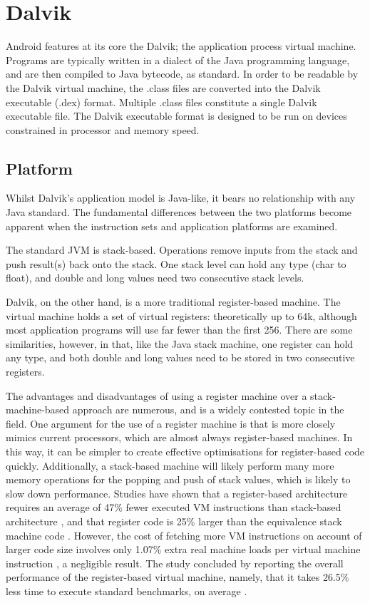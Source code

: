 \section{Dalvik}
\label{sec:dalvik}

Android features at its core the Dalvik; the application process virtual machine. Programs are typically written in a dialect of the Java programming language, and are then compiled to Java bytecode, as standard. In order to be readable by the Dalvik virtual machine, the .class files are converted into the Dalvik executable (.dex) format. Multiple .class files constitute a single Dalvik executable file. The Dalvik executable format is designed to be run on devices constrained in processor and memory speed.

\subsection*{Platform}

Whilst Dalvik's application model is Java-like, it bears no relationship with any Java standard. The fundamental differences between the two platforms become apparent when the instruction sets and application platforms are examined.

The standard JVM is stack-based. Operations remove inputs from the stack and push result(s) back onto the stack. One stack level can hold any type (char to float), and double and long values need two consecutive stack levels.

Dalvik, on the other hand, is a more traditional register-based machine. The virtual machine holds a set of virtual registers: theoretically up to 64k, although most application programs will use far fewer than the first 256. There are some similarities, however, in that, like the Java stack machine, one register can hold any type, and both double and long values need to be stored in two consecutive registers.

The advantages and disadvantages of using a register machine over a stack-machine-based approach are numerous, and is a widely contested topic in the field. One argument for the use of a register machine is that is more closely mimics current processors, which are almost always register-based machines. In this way, it can be simpler to create effective optimisations for register-based code quickly. Additionally, a stack-based machine will likely perform many more memory operations for the popping and push of stack values, which is likely to slow down performance. Studies have shown that a register-based architecture requires an average of 47\% fewer executed VM instructions than stack-based architecture \cite{vmshowdown}, and that register code is 25\% larger than the equivalence stack machine code \cite{vmshowdown}. However, the cost of fetching more VM instructions on account of larger code size involves only 1.07\% extra real machine loads per virtual machine instruction \cite{vmshowdown}, a negligible result. The study concluded by reporting the overall performance of the register-based virtual machine, namely, that it takes 26.5\% less time to execute standard benchmarks, on average \cite{vmshowdown}.


